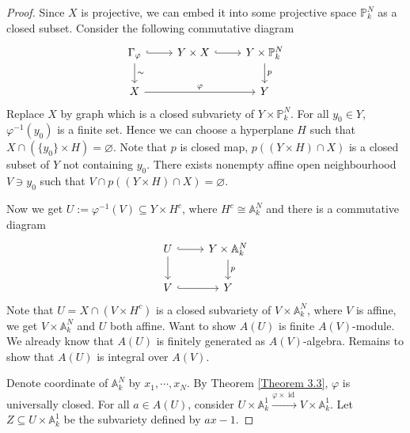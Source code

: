 \documentclass{ctexart}
\newcommand{\identity}{\operatorname{id}}
\begin{document}
\begin{proof}
    Since $X$ is projective, we can embed it into some projective space $\mathbb{P}_{k}^{N}$ as a closed subset.
    Consider the following commutative diagram
    \begin{equation}
        \begin{tikzcd}
            \Gamma_{\varphi} \arrow[r, hookrightarrow] \arrow[d, "\sim"] & 
            Y \times X \arrow[r, hookrightarrow] &
            Y \times \mathbb{P}_{k}^{N} \arrow[d, "p"] \\
            X \arrow[rr, "\varphi"] && 
            Y
        \end{tikzcd}
    \end{equation}
    Replace $X$ by graph which is a closed subvariety of $Y \times \mathbb{P}_{k}^{N}$.
    For all $y_{0}\in Y$, $\varphi^{-1}(y_{0})$ is a finite set.
    Hence we can choose a hyperplane $H$ such that $X \cap (\{y_{0}\} \times H) = \varnothing$.
    Note that $p$ is closed map, $p((Y \times H) \cap X)$ is a closed subset of $Y$ not containing $y_{0}$.
    There exists nonempty affine open neighbourhood $V\ni y_{0}$ such that $V \cap p((Y \times H) \cap X) = \varnothing$.
    \par
    Now we get $U := \varphi^{-1}(V) \subseteq Y \times H^{c}$, where $H^{c} \cong \mathbb{A}_{k}^{N}$ and there is a commutative diagram
    \begin{equation}
        \begin{tikzcd}
            U \arrow[r, hookrightarrow] \arrow[d] &
            Y \times \mathbb{A}_{k}^{N} \arrow[d, "p"] \\
            V \arrow[r, hookrightarrow] &
            Y 
        \end{tikzcd}
    \end{equation}
    Note that $U = X \cap (V \times H^{c})$ is a closed subvariety of $V \times \mathbb{A}_{k}^{N}$,
    where $V$ is affine, we get $V \times \mathbb{A}_{k}^{N}$ and $U$ both affine.
    Want to show $A(U)$ is finite $A(V)$-module.
    We already know that $A(U)$ is finitely generated as $A(V)$-algebra.
    Remains to show that $A(U)$ is integral over $A(V)$.
    \par
    Denote coordinate of $\mathbb{A}_{k}^{N}$ by $x_{1}, \cdots, x_{N}$.
    By Theorem \ref{Theorem 3.3}, $\varphi$ is universally closed.
    For all $a\in A(U)$, consider $U \times \mathbb{A}_{k}^{1} \overset{\varphi \times \identity}{\rightarrow} V \times \mathbb{A}_{k}^{1}$.
    Let $Z \subseteq U \times \mathbb{A}_{k}^{1}$ be the subvariety defined by $ax - 1$.

\end{proof}
\end{document}
